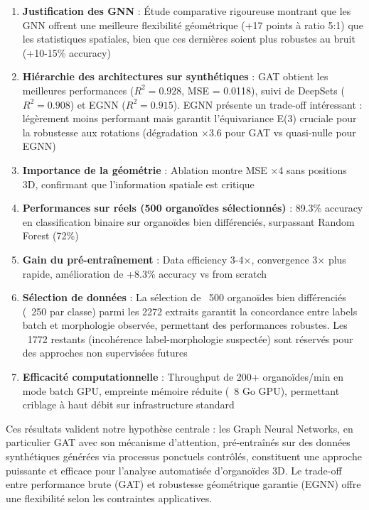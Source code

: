 \begin{enumerate}
    \item \textbf{Justification des GNN} : Étude comparative rigoureuse montrant que les GNN offrent une meilleure flexibilité géométrique (+17 points à ratio 5:1) que les statistiques spatiales, bien que ces dernières soient plus robustes au bruit (+10-15\% accuracy)
    
    \item \textbf{Hiérarchie des architectures sur synthétiques} : GAT obtient les meilleures performances ($R^2 = 0.928$, MSE = 0.0118), suivi de DeepSets ($R^2 = 0.908$) et EGNN ($R^2 = 0.915$). EGNN présente un trade-off intéressant : légèrement moins performant mais garantit l'équivariance E(3) cruciale pour la robustesse aux rotations (dégradation ×3.6 pour GAT vs quasi-nulle pour EGNN)
    
    \item \textbf{Importance de la géométrie} : Ablation montre MSE ×4 sans positions 3D, confirmant que l'information spatiale est critique
    
    \item \textbf{Performances sur réels (500 organoïdes sélectionnés)} : 89.3\% accuracy en classification binaire sur organoïdes bien différenciés, surpassant Random Forest (72\%)
    
    \item \textbf{Gain du pré-entraînement} : Data efficiency 3-4×, convergence 3× plus rapide, amélioration de +8.3\% accuracy vs from scratch
    
    \item \textbf{Sélection de données} : La sélection de ~500 organoïdes bien différenciés (~250 par classe) parmi les 2272 extraits garantit la concordance entre labels batch et morphologie observée, permettant des performances robustes. Les ~1772 restants (incohérence label-morphologie suspectée) sont réservés pour des approches non supervisées futures
    
    \item \textbf{Efficacité computationnelle} : Throughput de 200+ organoïdes/min en mode batch GPU, empreinte mémoire réduite (~8 Go GPU), permettant criblage à haut débit sur infrastructure standard
\end{enumerate}

Ces résultats valident notre hypothèse centrale : les Graph Neural Networks, en particulier GAT avec son mécanisme d'attention, pré-entraînés sur des données synthétiques générées via processus ponctuels contrôlés, constituent une approche puissante et efficace pour l'analyse automatisée d'organoïdes 3D. Le trade-off entre performance brute (GAT) et robustesse géométrique garantie (EGNN) offre une flexibilité selon les contraintes applicatives.
